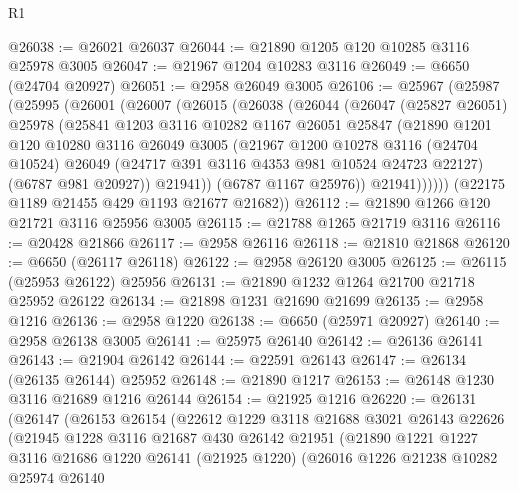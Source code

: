 \begin{lexlean}{R1}
\begin{coremodule}
@26038 := @26021 @26037
@26044 := @21890 @1205 @120 @10285 @3116 @25978 @3005
@26047 := @21967 @1204 @10283 @3116
@26049 := @6650 (@24704 @20927)
@26051 := @2958 @26049 @3005
@26106 := @25967
    (@25987
      (@25995
        (@26001
          (@26007
            (@26015
              (@26038
                (@26044
                  (@26047
                    (@25827 @26051)
                    @25978
                    (@25841
                      @1203
                      @3116
                      @10282
                      @1167
                      @26051
                      @25847
                      (@21890
                        @1201
                        @120
                        @10280
                        @3116
                        @26049
                        @3005
                        (@21967
                          @1200
                          @10278
                          @3116
                          (@24704 @10524)
                          @26049
                          (@24717 @391 @3116 @4353 @981 @10524 @24723 @22127)
                          (@6787 @981 @20927))
                        @21941))
                    (@6787 @1167 @25976))
                  @21941))))))
      (@22175 @1189 @21455 @429 @1193 @21677 @21682))
@26112 := @21890 @1266 @120 @21721 @3116 @25956 @3005
@26115 := @21788 @1265 @21719 @3116
@26116 := @20428 @21866
@26117 := @2958 @26116
@26118 := @21810 @21868
@26120 := @6650 (@26117 @26118)
@26122 := @2958 @26120 @3005
@26125 := @26115 (@25953 @26122) @25956
@26131 := @21890 @1232 @1264 @21700 @21718 @25952 @26122
@26134 := @21898 @1231 @21690 @21699
@26135 := @2958 @1216
@26136 := @2958 @1220
@26138 := @6650 (@25971 @20927)
@26140 := @2958 @26138 @3005
@26141 := @25975 @26140
@26142 := @26136 @26141
@26143 := @21904 @26142
@26144 := @22591 @26143
@26147 := @26134 (@26135 @26144) @25952
@26148 := @21890 @1217
@26153 := @26148 @1230 @3116 @21689 @1216 @26144
@26154 := @21925 @1216
@26220 := @26131
    (@26147
      (@26153
        @26154
        (@22612
          @1229
          @3118
          @21688
          @3021
          @26143
          @22626
          (@21945
            @1228
            @3116
            @21687
            @430
            @26142
            @21951
            (@21890
              @1221
              @1227
              @3116
              @21686
              @1220
              @26141
              (@21925 @1220)
              (@26016
                @1226
                @21238
                @10282
                @25974
                @26140

\end{coremodule}
\end{lexlean}
